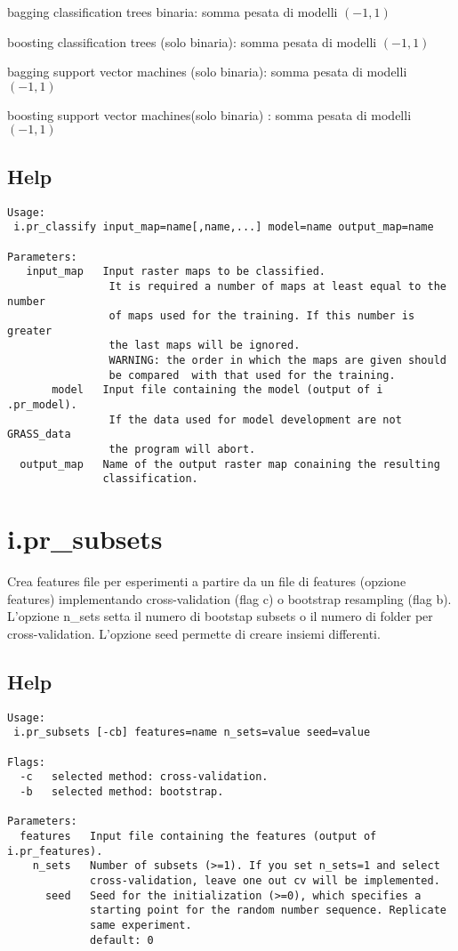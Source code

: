 \noindent
bagging classification trees binaria: somma pesata di modelli $(-1,1)$

\noindent
boosting classification trees (solo binaria): somma pesata di modelli $(-1,1)$

\noindent
bagging support vector machines (solo binaria): somma pesata di modelli $(-1,1)$

\noindent
boosting support vector machines(solo binaria) : somma pesata di modelli $(-1,1)$

\subsection*{Help}
\begin{verbatim}
Usage:
 i.pr_classify input_map=name[,name,...] model=name output_map=name

Parameters:
   input_map   Input raster maps to be classified.
                It is required a number of maps at least equal to the number 
                of maps used for the training. If this number is greater 
                the last maps will be ignored.
                WARNING: the order in which the maps are given should 
                be compared  with that used for the training.
       model   Input file containing the model (output of i .pr_model).
                If the data used for model development are not GRASS_data 
                the program will abort.
  output_map   Name of the output raster map conaining the resulting 
               classification.
\end{verbatim}


\section*{i.pr\_subsets}
Crea features file per esperimenti a partire da un file di features
(opzione features) implementando cross-validation (flag c) o bootstrap
resampling (flag b). L'opzione n\_sets setta il numero di bootstap
subsets o il numero di folder per cross-validation. L'opzione seed permette di creare insiemi differenti.

\subsection*{Help}
\begin{verbatim}
Usage:
 i.pr_subsets [-cb] features=name n_sets=value seed=value

Flags:
  -c   selected method: cross-validation.
  -b   selected method: bootstrap.

Parameters:
  features   Input file containing the features (output of i.pr_features).
    n_sets   Number of subsets (>=1). If you set n_sets=1 and select 
             cross-validation, leave one out cv will be implemented.
      seed   Seed for the initialization (>=0), which specifies a 
             starting point for the random number sequence. Replicate
             same experiment.
             default: 0
\end{verbatim}

